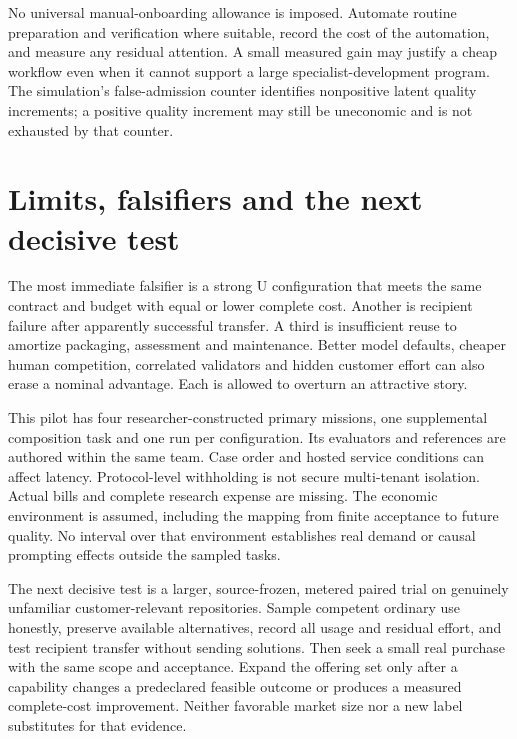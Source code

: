 \documentclass[11pt,letterpaper]{article}
\begin{document}
No universal manual-onboarding allowance is imposed. Automate routine preparation and verification where suitable, record the cost of the automation, and measure any residual attention. A small measured gain may justify a cheap workflow even when it cannot support a large specialist-development program. The simulation's false-admission counter identifies nonpositive latent quality increments; a positive quality increment may still be uneconomic and is not exhausted by that counter.

\section{Limits, falsifiers and the next decisive test}
The most immediate falsifier is a strong U configuration that meets the same contract and budget with equal or lower complete cost. Another is recipient failure after apparently successful transfer. A third is insufficient reuse to amortize packaging, assessment and maintenance. Better model defaults, cheaper human competition, correlated validators and hidden customer effort can also erase a nominal advantage. Each is allowed to overturn an attractive story.

This pilot has four researcher-constructed primary missions, one supplemental composition task and one run per configuration. Its evaluators and references are authored within the same team. Case order and hosted service conditions can affect latency. Protocol-level withholding is not secure multi-tenant isolation. Actual bills and complete research expense are missing. The economic environment is assumed, including the mapping from finite acceptance to future quality. No interval over that environment establishes real demand or causal prompting effects outside the sampled tasks.

The next decisive test is a larger, source-frozen, metered paired trial on genuinely unfamiliar customer-relevant repositories. Sample competent ordinary use honestly, preserve available alternatives, record all usage and residual effort, and test recipient transfer without sending solutions. Then seek a small real purchase with the same scope and acceptance. Expand the offering set only after a capability changes a predeclared feasible outcome or produces a measured complete-cost improvement. Neither favorable market size nor a new label substitutes for that evidence.
\end{document}
